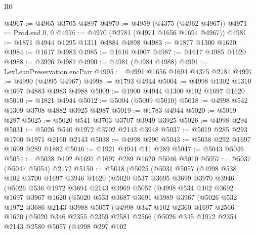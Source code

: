 \begin{lexlean}{R0}
\begin{coremodule}
@4967 := @4965 @3705 @4897
@4970 := @4959 (@4375 (@4962 @4967))
@4971 := Prod.snd.{0, 0}
@4976 := @4970 (@2781 (@4971 @1656 @1694 @4967))
@4981 := @1871 @4944 @1295 @1311 @4884 @4898
@4983 := @1877 @1300 @1620
@4984 := @1617 @4983
@4985 := @1616 @4907
@4987 := @1617 @4985 @1620
@4988 := @3926 @4987
@4990 := @4981 (@4984 @4988)
@4991 := LexLeanPreservation.encPair
@4995 := @4991 @1656 @1694 @4375 @2781
@4997 := @4990 (@4995 @4967)
@4998 := @1793 @4944
@5004 := @4998 @1302 @1310 @1697 @4883 @4983 @4988
@5009 := @1900 @4944 @1300 @102 @1697 @1620
@5010 := @1821 @4944
@5012 := @5004 (@5009 @5010)
@5018 := @4998 @542 @1309 @3708 @4882 @3925 @4987
@5019 := @1783 @4944
@5020 := @5019 @287
@5025 := @5020 @541 @3703 @3707 @3949 @3925
@5026 := @4998 @294
@5031 := @5026 @540 @1972 @3702 @2143 @3948
@5037 := @5019 @285 @293 @1700 @1971 @2160 @2143
@5038 := @4998 @290
@5043 := @5038 @292 @1697 @1699 @289 @1882
@5046 := @1921 @4944 @11 @289
@5047 := @5043 @5046
@5054 := @5038 @102 @1697 @1697 @289 @1620 @5046 @5010
@5057 := @5037 (@5047 @5054) @2172
@5150 := @5018
    (@5025
      (@5031
        @5057
        (@4998
          @538
          @102
          @3700
          @1697
          @3946
          @1620
          (@5020
            @537
            @3695
            @3699
            @3970
            @3946
            (@5026
              @536
              @1972
              @3694
              @2143
              @3969
              @5057
              (@4998
                @534
                @102
                @3692
                @1697
                @3967
                @1620
                (@5020
                  @533
                  @3687
                  @3691
                  @3989
                  @3967
                  (@5026
                    @532
                    @1972
                    @3686
                    @2143
                    @3988
                    @5057
                    (@4998
                      @347
                      @102
                      @2360
                      @1697
                      @2566
                      @1620
                      (@5020
                        @346
                        @2355
                        @2359
                        @2581
                        @2566
                        (@5026
                          @345
                          @1972
                          @2354
                          @2143
                          @2580
                          @5057
                          (@4998
                            @297
                            @102

\end{coremodule}
\end{lexlean}
